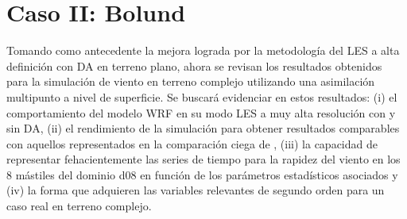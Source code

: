 \newpage
\section{Caso II: Bolund}
Tomando como antecedente la mejora lograda por la metodología del LES a alta definición con DA en terreno plano, ahora se revisan los resultados obtenidos para la simulación de viento en terreno complejo utilizando una asimilación multipunto a nivel de superficie. Se buscará evidenciar en estos resultados: (i) el comportamiento del modelo WRF en su modo LES a muy alta resolución con y sin DA, (ii) el rendimiento de la simulación para obtener resultados comparables con aquellos representados en la comparación ciega de \cite{Bechmann2011}, (iii) la capacidad de representar fehacientemente las series de tiempo para la rapidez del viento en los 8 mástiles del dominio d08 en función de los parámetros estadísticos asociados y (iv) la forma que adquieren las variables relevantes de segundo orden para un caso real en terreno complejo.

